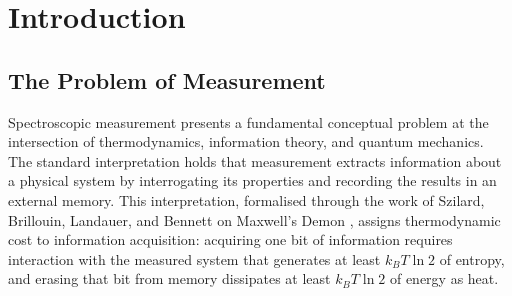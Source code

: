 \documentclass[12pt,a4paper]{article}
\theoremstyle{definition}
\theoremstyle{remark}
\begin{document}
\begin{abstract}
The framework predicts autocatalytic structure in spectroscopic measurement: each resonant coupling event creates categorical burden that facilitates subsequent measurements. This prediction explains signal averaging enhancement, coherent spectroscopy advantages, and multi-dimensional correlation spectroscopy, where each spectral dimension primes the partition structure for richer information extraction in subsequent dimensions. Virtual instruments, implemented through software-defined signal processing on fixed hardware oscillators, inherit this autocatalytic structure and achieve spectroscopic capability without dedicated optical or magnetic components.

The unification establishes that the historical term ``Molecular Maxwell Demon,'' used to describe molecular recognition and selectivity, should be understood as information catalysis through categorical apertures. No demon exists because no information processing occurs. Molecular specificity arises from geometric complementarity between aperture and substrate, enabling partition completion that generates rather than extracts information about molecular structure.

\textbf{Keywords:} information catalysis, categorical apertures, partition completion, Maxwell's Demon, resonant coupling, virtual spectrometers, phase-lock networks, autocatalytic measurement
\end{abstract}

\tableofcontents
\newpage

\section{Introduction}
\label{sec:introduction}

\subsection{The Problem of Measurement}

Spectroscopic measurement presents a fundamental conceptual problem at the intersection of thermodynamics, information theory, and quantum mechanics. The standard interpretation holds that measurement extracts information about a physical system by interrogating its properties and recording the results in an external memory. This interpretation, formalised through the work of Szilard, Brillouin, Landauer, and Bennett on Maxwell's Demon \citep{szilard1929, brillouin1951, landauer1961, bennett1982}, assigns thermodynamic cost to information acquisition: acquiring one bit of information requires interaction with the measured system that generates at least $k_B T \ln 2$ of entropy, and erasing that bit from memory dissipates at least $k_B T \ln 2$ of energy as heat.
\end{document}
